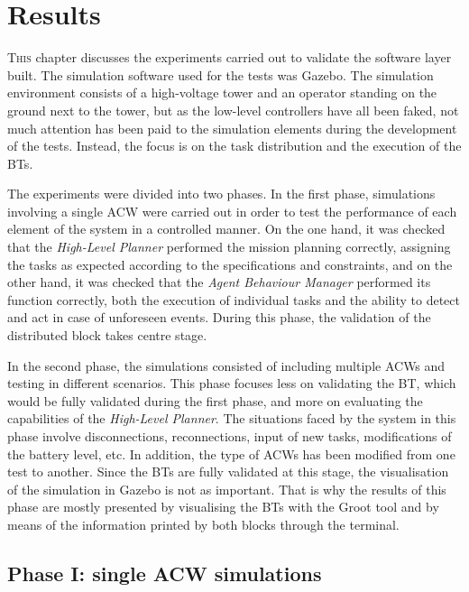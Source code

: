 \chapter{Results}
\label{ch:Results}
\lettrine[lraise=-0.1, lines=2, loversize=0.2]{T}{his} chapter discusses the experiments carried out to validate the software layer built. The simulation software used for the tests was Gazebo. The simulation environment consists of a high-voltage tower and an operator standing on the ground next to the tower, but as the low-level controllers have all been faked, not much attention has been paid to the simulation elements during the development of the tests. Instead, the focus is on the task distribution and the execution of the \glspl{BT}.

The experiments were divided into two phases. In the first phase, simulations involving a single \gls{ACW} were carried out in order to test the performance of each element of the system in a controlled manner. On the one hand, it was checked that the \emph{High-Level Planner} performed the mission planning correctly, assigning the tasks as expected according to the specifications and constraints, and on the other hand, it was checked that the \emph{Agent Behaviour Manager} performed its function correctly, both the execution of individual tasks and the ability to detect and act in case of unforeseen events. During this phase, the validation of the distributed block takes centre stage.

In the second phase, the simulations consisted of including multiple \glspl{ACW} and testing in different scenarios. This phase focuses less on validating the \gls{BT}, which would be fully validated during the first phase, and more on evaluating the capabilities of the \emph{High-Level Planner}. The situations faced by the system in this phase involve disconnections, reconnections, input of new tasks, modifications of the battery level, etc. In addition, the type of \glspl{ACW} has been modified from one test to another. Since the \glspl{BT} are fully validated at this stage, the visualisation of the simulation in Gazebo is not as important. That is why the results of this phase are mostly presented by visualising the \glspl{BT} with the Groot tool and by means of the information printed by both blocks through the terminal. 

\section{Phase I: single \gls{ACW} simulations}
\label{sec:phaseI}

